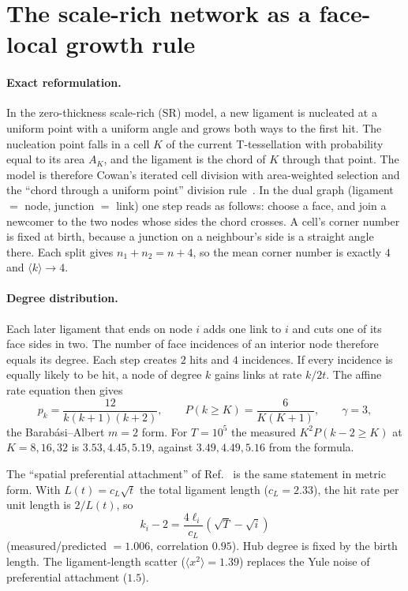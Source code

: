 \section{The scale-rich network as a face-local growth rule}
\label{sec:sr-lng}

\paragraph{Exact reformulation.}
In the zero-thickness scale-rich (SR) model, a new ligament is nucleated at a
uniform point with a uniform angle and grows both ways to the first hit. The
nucleation point falls in a cell $K$ of the current T-tessellation with
probability equal to its area $A_K$, and the ligament is the chord of $K$
through that point. The model is therefore Cowan's iterated cell division with
area-weighted selection and the ``chord through a uniform point'' division
rule~\cite{cowan2010}. In the dual graph (ligament $=$ node, junction $=$
link) one step reads as follows: choose a face, and join a newcomer to the two
nodes whose sides the chord crosses. A cell's corner number is fixed at birth,
because a junction on a neighbour's side is a straight angle there. Each split
gives $n_1+n_2=n+4$, so the mean corner number is exactly $4$ and
$\langle k\rangle\to4$.

\paragraph{Degree distribution.}
Each later ligament that ends on node $i$ adds one link to $i$ and cuts one of
its face sides in two. The number of face incidences of an interior node
therefore equals its degree. Each step creates $2$ hits and $4$ incidences. If
every incidence is equally likely to be hit, a node of degree $k$ gains links
at rate $k/2t$. The affine rate equation then gives
\begin{equation}
  p_k=\frac{12}{k(k+1)(k+2)},\qquad P(k\ge K)=\frac{6}{K(K+1)},\qquad \gamma=3,
\end{equation}
the Barab\'asi--Albert $m=2$ form. For $T=10^5$ the measured
$K^2P(k-2\ge K)$ at $K=8,16,32$ is $3.53,4.45,5.19$, against
$3.49,4.49,5.16$ from the formula.

The ``spatial preferential attachment'' of Ref.~\cite{both2026} is the same
statement in metric form. With $L(t)=c_L\sqrt t$ the total ligament length
($c_L=2.33$), the hit rate per unit length is $2/L(t)$, so
\begin{equation}
  k_i-2=\frac{4\ell_i}{c_L}\left(\sqrt T-\sqrt i\right)
\end{equation}
(measured/predicted $=1.006$, correlation $0.95$). Hub degree is fixed by the
birth length. The ligament-length scatter ($\langle x^2\rangle=1.39$) replaces
the Yule noise of preferential attachment ($1.5$).

